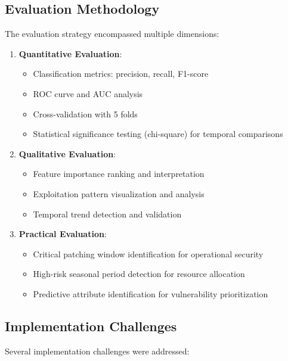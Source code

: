 \documentclass[runningheads]{llncs}
\begin{document}
\subsection{Evaluation Methodology}
The evaluation strategy encompassed multiple dimensions:

\begin{enumerate}
    \item \textbf{Quantitative Evaluation}:
    \begin{itemize}
        \item Classification metrics: precision, recall, F1-score
        \item ROC curve and AUC analysis
        \item Cross-validation with 5 folds
        \item Statistical significance testing (chi-square) for temporal comparisons
    \end{itemize}
    
    \item \textbf{Qualitative Evaluation}:
    \begin{itemize}
        \item Feature importance ranking and interpretation
        \item Exploitation pattern visualization and analysis
        \item Temporal trend detection and validation
    \end{itemize}
    
    \item \textbf{Practical Evaluation}:
    \begin{itemize}
        \item Critical patching window identification for operational security
        \item High-risk seasonal period detection for resource allocation
        \item Predictive attribute identification for vulnerability prioritization
    \end{itemize}
\end{enumerate}

\subsection{Implementation Challenges}
Several implementation challenges were addressed:
\end{document}
